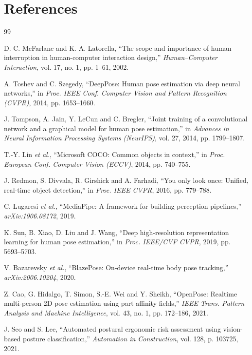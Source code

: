 ﻿\documentclass[12pt,a4paper]{article}
\begin{document}
\section*{References}
\begingroup
\small
{}
\begin{thebibliography}{99}
\setlength{\itemsep}{3pt}

D. C. McFarlane and K. A. Latorella, ``The scope and importance of human interruption in human-computer interaction design,'' \textit{Human--Computer Interaction}, vol. 17, no. 1, pp. 1--61, 2002.

A. Toshev and C. Szegedy, ``DeepPose: Human pose estimation via deep neural networks,'' in \textit{Proc. IEEE Conf. Computer Vision and Pattern Recognition (CVPR)}, 2014, pp. 1653--1660.

J. Tompson, A. Jain, Y. LeCun and C. Bregler, ``Joint training of a convolutional network and a graphical model for human pose estimation,'' in \textit{Advances in Neural Information Processing Systems (NeurIPS)}, vol. 27, 2014, pp. 1799--1807.

T.-Y. Lin \textit{et al.}, ``Microsoft COCO: Common objects in context,'' in \textit{Proc. European Conf. Computer Vision (ECCV)}, 2014, pp. 740--755.

J. Redmon, S. Divvala, R. Girshick and A. Farhadi, ``You only look once: Unified, real-time object detection,'' in \textit{Proc. IEEE CVPR}, 2016, pp. 779--788.

C. Lugaresi \textit{et al.}, ``MediaPipe: A framework for building perception pipelines,'' \textit{arXiv:1906.08172}, 2019.

K. Sun, B. Xiao, D. Liu and J. Wang, ``Deep high-resolution representation learning for human pose estimation,'' in \textit{Proc. IEEE/CVF CVPR}, 2019, pp. 5693--5703.

V. Bazarevsky \textit{et al.}, ``BlazePose: On-device real-time body pose tracking,'' \textit{arXiv:2006.10204}, 2020.

Z. Cao, G. Hidalgo, T. Simon, S.-E. Wei and Y. Sheikh, ``OpenPose: Realtime multi-person 2D pose estimation using part affinity fields,'' \textit{IEEE Trans. Pattern Analysis and Machine Intelligence}, vol. 43, no. 1, pp. 172--186, 2021.

J. Seo and S. Lee, ``Automated postural ergonomic risk assessment using vision-based posture classification,'' \textit{Automation in Construction}, vol. 128, p. 103725, 2021.


\end{thebibliography}
\end{document}
